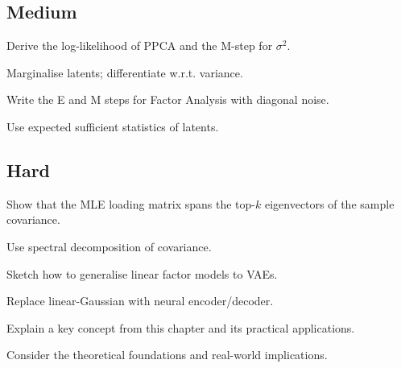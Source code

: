 \subsection*{Medium}

\begin{exercisebox}[medium]
\begin{problem}
Derive the log-likelihood of PPCA and the M-step for $\sigma^2$.
\end{problem}
\begin{hintbox}
Marginalise latents; differentiate w.r.t. variance.
\end{hintbox}
\end{exercisebox}


\begin{exercisebox}[medium]
\begin{problem}[EM for FA]
Write the E and M steps for Factor Analysis with diagonal noise.
\end{problem}
\begin{hintbox}
Use expected sufficient statistics of latents.
\end{hintbox}
\end{exercisebox}


\subsection*{Hard}

\begin{exercisebox}[hard]
\begin{problem}
Show that the MLE loading matrix spans the top-$k$ eigenvectors of the sample covariance.
\end{problem}
\begin{hintbox}
Use spectral decomposition of covariance.
\end{hintbox}
\end{exercisebox}


\begin{exercisebox}[hard]
\begin{problem}
Sketch how to generalise linear factor models to VAEs.
\end{problem}
\begin{hintbox}
Replace linear-Gaussian with neural encoder/decoder.
\end{hintbox}
\end{exercisebox}




\begin{exercisebox}[hard]
\begin{problem}
Explain a key concept from this chapter and its practical applications.
\end{problem}
\begin{hintbox}
Consider the theoretical foundations and real-world implications.
\end{hintbox}
\end{exercisebox}


